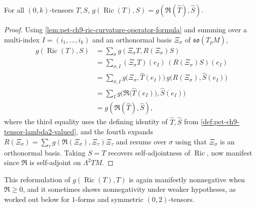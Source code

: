 \begin{lemma}[Lemma 9.4.9]
  \label{lem:pet-ch9-ric-curvature-operator-hat-formula}
  For all $(0,k)$-tensors $T,S$, $g(\operatorname{Ric}(T),S)=g(\mathfrak{R}(\hat T),\hat S)$.
\end{lemma}
\begin{proof}
  Using \cref{lem:pet-ch9-ric-curvature-operator-formula} and summing over a
  multi-index $I=(i_1,\dots,i_k)$ and an orthonormal basis $\Xi_\sigma$ of
  $\mathfrak{so}(T_pM)$,
  \begin{align*}
    g(\operatorname{Ric}(T),S)&=\sum_\sigma g(\Xi_\sigma T,R(\Xi_\sigma)S)\\
    &=\sum_{\sigma,I}(\Xi_\sigma T)(e_I)\,(R(\Xi_\sigma)S)(e_I)\\
    &=\sum_{\sigma,I}g\big(\Xi_\sigma,\hat T(e_I)\big)\,g\big(R(\Xi_\sigma),\hat S(e_I)\big)\\
    &=\sum_I g\Big(\mathfrak{R}\big(\hat T(e_I)\big),\hat S(e_I)\Big)\\
    &=g(\mathfrak{R}(\hat T),\hat S),
  \end{align*}
  where the third equality uses the defining identity of
  $\hat T,\hat S$ from \cref{def:pet-ch9-tensor-lambda2-valued}, and the fourth
  expands $R(\Xi_\sigma)=\sum_\tau g(\mathfrak{R}(\Xi_\sigma),\Xi_\tau)\Xi_\tau$ and
  resums over $\sigma$ using that $\Xi_\sigma$ is an orthonormal basis. Taking
  $S=T$ recovers self-adjointness of $\operatorname{Ric}$, now manifest since
  $\mathfrak{R}$ is self-adjoint on $\Lambda^2TM$.
\end{proof}

This reformulation of $g(\operatorname{Ric}(T),T)$ is again manifestly nonnegative when
$\mathfrak{R}\ge0$, and it sometimes shows nonnegativity under weaker
hypotheses, as worked out below for $1$-forms and symmetric $(0,2)$-tensors.

